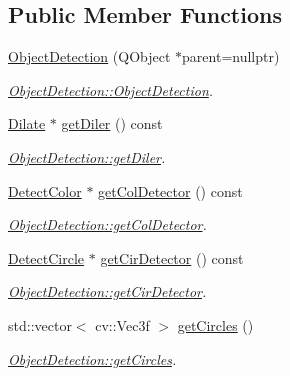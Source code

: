 \subsection*{Public Member Functions}
\begin{DoxyCompactItemize}
\item 
\hyperlink{class_image_processor_1_1_object_detection_ab80e0235c8882a62f21faea4796b325f}{Object\+Detection} (Q\+Object $\ast$parent=nullptr)
\begin{DoxyCompactList}\small\item\em \hyperlink{class_image_processor_1_1_object_detection_ab80e0235c8882a62f21faea4796b325f}{Object\+Detection\+::\+Object\+Detection}. \end{DoxyCompactList}\item 
\hyperlink{class_image_processor_1_1_dilate}{Dilate} $\ast$ \hyperlink{class_image_processor_1_1_object_detection_a2b5e3886ae9770e412cc4d21dfe031dd}{get\+Diler} () const
\begin{DoxyCompactList}\small\item\em \hyperlink{class_image_processor_1_1_object_detection_a2b5e3886ae9770e412cc4d21dfe031dd}{Object\+Detection\+::get\+Diler}. \end{DoxyCompactList}\item 
\hyperlink{class_image_processor_1_1_detect_color}{Detect\+Color} $\ast$ \hyperlink{class_image_processor_1_1_object_detection_a65da5b494041b0da792dd01a90bcf065}{get\+Col\+Detector} () const
\begin{DoxyCompactList}\small\item\em \hyperlink{class_image_processor_1_1_object_detection_a65da5b494041b0da792dd01a90bcf065}{Object\+Detection\+::get\+Col\+Detector}. \end{DoxyCompactList}\item 
\hyperlink{class_image_processor_1_1_detect_circle}{Detect\+Circle} $\ast$ \hyperlink{class_image_processor_1_1_object_detection_a8a9535796772b425c44fd5a318adbe5f}{get\+Cir\+Detector} () const
\begin{DoxyCompactList}\small\item\em \hyperlink{class_image_processor_1_1_object_detection_a8a9535796772b425c44fd5a318adbe5f}{Object\+Detection\+::get\+Cir\+Detector}. \end{DoxyCompactList}\item 
std\+::vector$<$ cv\+::\+Vec3f $>$ \hyperlink{class_image_processor_1_1_object_detection_aa0f939d2dcf5ec755be433db03fafda6}{get\+Circles} ()
\begin{DoxyCompactList}\small\item\em \hyperlink{class_image_processor_1_1_object_detection_aa0f939d2dcf5ec755be433db03fafda6}{Object\+Detection\+::get\+Circles}. \end{DoxyCompactList}\item 

\end{DoxyCompactItemize}
